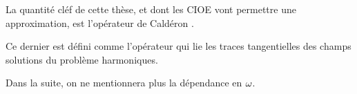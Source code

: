   La quantité cléf de cette thèse, et dont les CIOE vont permettre une approximation, est l'opérateur de Caldéron \cite[Def~4, p.~108]{cessenat_mathematical_1996}.

  Ce dernier est défini comme l'opérateur qui lie les traces tangentielles des champs solutions du problème harmoniques.


Dans la suite, on ne mentionnera plus la dépendance en \(\omega\).

